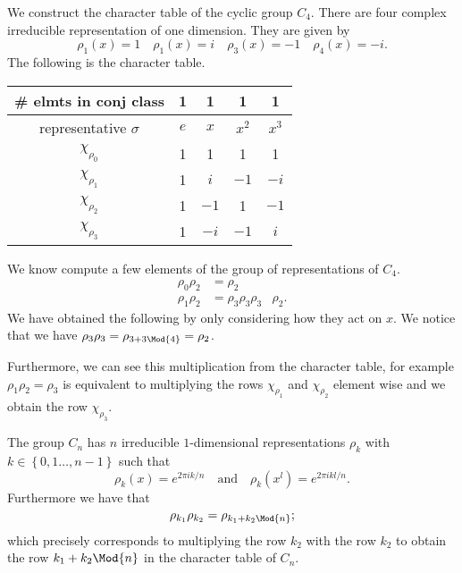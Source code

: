 \documentclass[12pt, a4paper]{article}
\begin{document}
\begin{mdexample}
    We construct the character table of the cyclic group \(C_4\). There are four complex irreducible representation of one dimension. They are given by 
    \[\rho_1(x)=1 \quad \rho_1(x)=i \quad \rho_3(x)=-1 \quad \rho_4(x)=-i.\]
    The following is the character table.
    \begin{center}
        \begin{tabular}{c|c|c|c|c}
            \# elmts in conj class & 1 & 1 & 1 & 1 \\
            \hline
            representative $\sigma$ & $e$ & $x$ & $x^2$ & $x^3$ \\
            \hline
            $\chi_{\rho_0}$ & 1 & 1 & 1 & 1 \\
            $\chi_{\rho_1}$ & 1 & $i$ & $-1$ & $-i$ \\
            $\chi_{\rho_2}$ & 1 & $-1$ & 1 & $-1$ \\
            $\chi_{\rho_3}$ & 1 & $-i$ & $-1$ & $i$ \\
            \end{tabular}
    \end{center}
    We know compute a few elements of the group of representations of \(C_4\). 
    \[\begin{aligned}
        \rho_0 \rho_2 &= \rho_2 \\
        \rho_1\rho_2 &=\rho_3
        \rho_3\rho_3 &\rho_2.
    \end{aligned}\]
    We have obtained the following by only considering how they act on \(x\). We notice that we have \(\rho_3\rho_3=\rho_{3+3 \Mod{4}} = \rho_2\). 

    Furthermore, we can see this multiplication from the character table, for example \(\rho_1\rho_2 = \rho_3\) is equivalent to multiplying the rows \(\chi_{\rho_1}\) and \(\chi_{\rho_2}\) element wise and we obtain the row \(\chi_{\rho_3}\). 
\end{mdexample}

\begin{mdprop}
    The group \(C_n\) has \(n\) irreducible \(1\)-dimensional representations \(\rho_k\) with \\ \(k \in \left\{ 0,1\ldots,n-1\right\}\) such that 
    \[\rho_k(x) = e^{2\pi i k/n} \quad \text{and} \quad \rho_k(x^l)=e^{2\pi ikl/n}.\]
    Furthermore we have that 
    \[\rho_{k_1}\rho_{k_2} = \rho_{k_1+k_2 \Mod{n}};\]
    which precisely corresponds to multiplying the row \(k_2\) with the row \(k_2\) to obtain the row \(k_1+k_2 \Mod{n}\) in the character table of \(C_n\).
\end{mdprop}
\end{document}
